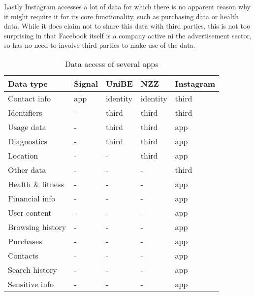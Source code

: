 \documentclass[a4paper]{scrreprt}
\begin{document}
Lastly Instagram accesses a lot of data for which there is no apparent reason
why it might require it for its core functionality, such as purchasing data or
health data. While it does claim not to share this data with third parties,
this is not too surprising in that Facebook itself is a company active ni the
advertisement sector, so has no need to involve third parties to make use of
the data.

\begin{table}
		\centering
		\begin{tabular}{lllll}
				\toprule
				Data type & Signal & UniBE & NZZ & Instagram \\
				\midrule
				Contact info      & app & identity & identity & third \\
				Identifiers       & -   & third    & third    & third \\
				Usage data        & -   & third    & third    & app \\
				Diagnostics       & -   & third    & third    & app \\
				Location          & -   & -        & third    & app \\
				Other data        & -   & -        & -        & third \\
				Health \& fitness & -   & -        & -        & app \\
				Financial info    & -   & -        & -        & app \\
				User content      & -   & -        & -        & app \\
				Browsing history  & -   & -        & -        & app \\
				Purchases         & -   & -        & -        & app \\
				Contacts          & -   & -        & -        & app \\
				Search history    & -   & -        & -        & app \\
				Sensitive info    & -   & -        & -        & app \\
				\bottomrule
		\end{tabular}
		\caption{Data access of several apps}
		\label{tbl:data_access_apps}
\end{table}

\printbibliography
\end{document}
